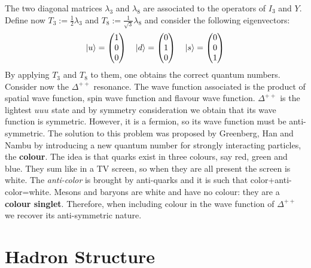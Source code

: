 \documentclass[10.75pt,a4paper,openright,bottom=2cm]{article}
\begin{document}
The two diagonal matrices $\lambda_3$ and $\lambda_8$ are associated to the operators of $I_3$ and $Y$.\\
Define now $T_3:=\frac{1}{2}\lambda_3$ and $T_8:=\frac{1}{\sqrt{3}}\lambda_8$ and consider the following eigenvectors:
\[
\ket{u}=\begin{pmatrix}
    1 \\ 0 \\ 0
\end{pmatrix} \quad \ket{d}=\begin{pmatrix}
    0 \\ 1 \\ 0
\end{pmatrix} \quad \ket{s}=\begin{pmatrix}
    0 \\ 0 \\ 1
\end{pmatrix}
\]
By applying $T_3$ and $T_8$ to them, one obtains the correct quantum numbers.\\
Consider now the $\Delta^{++}$ resonance. The wave function associated is the product of spatial wave function, spin wave function and flavour wave function. $\Delta^{++}$ is the lightest $uuu$ state and by symmetry consideration we obtain that its wave function is symmetric. However, it is a fermion, so its wave function must be anti-symmetric. The solution to this problem was proposed by Greenberg, Han and Nambu by introducing a new quantum number for strongly interacting particles, the \textbf{colour}. The idea is that quarks exist in three colours, say red, green and blue. They sum like in a TV screen, so when they are all present the screen is white. The \textit{anti-color} is brought by anti-quarks and it is such that color+anti-color=white. Mesons and baryons are white and have no colour: they are a \textbf{colour singlet}. Therefore, when including colour in the wave function of $\Delta^{++}$ we recover its anti-symmetric nature.
\newpage
\section{Hadron Structure}
\end{document}
